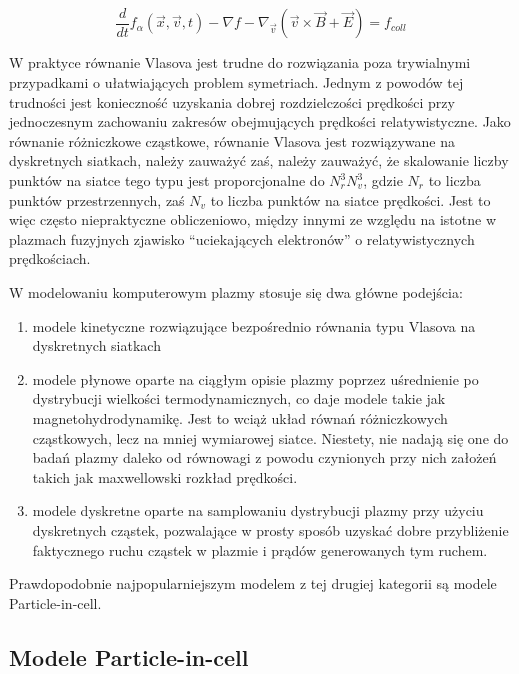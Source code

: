     \begin{equation}
        \frac{d} {dt} f_{\alpha} (\vec{x}, \vec{v}, t) - \nabla f - \nabla_{\vec{v}} (\vec{v} \times \vec{B} + \vec{E})= f_{coll}
        \label{eqn:Vlasov}
    \end{equation}

    W praktyce równanie Vlasova jest trudne do rozwiązania poza trywialnymi
    przypadkami o ułatwiających problem symetriach.  Jednym z powodów tej
    trudności jest konieczność uzyskania dobrej rozdzielczości prędkości przy
    jednoczesnym zachowaniu zakresów obejmujących prędkości relatywistyczne.
    Jako równanie różniczkowe cząstkowe, równanie Vlasova jest rozwiązywane na
    dyskretnych siatkach, należy zauważyć zaś, należy zauważyć, że skalowanie
    liczby punktów na siatce tego typu jest proporcjonalne do $N_r^3 N_v^3$,
    gdzie $N_r$ to liczba punktów przestrzennych, zaś $N_v$ to liczba punktów
    na siatce prędkości. Jest to więc często niepraktyczne obliczeniowo,
    między innymi ze względu na istotne w plazmach fuzyjnych zjawisko
    ``uciekających elektronów'' o relatywistycznych prędkościach.

    W modelowaniu komputerowym plazmy stosuje się dwa główne podejścia:
    \begin{enumerate}
        \item modele kinetyczne rozwiązujące bezpośrednio równania typu Vlasova na dyskretnych siatkach
        \item modele płynowe oparte na ciągłym opisie plazmy poprzez uśrednienie po dystrybucji
            wielkości termodynamicznych, co daje modele takie jak magnetohydrodynamikę. Jest to wciąż
            układ równań różniczkowych cząstkowych, lecz na mniej wymiarowej siatce. Niestety,
            nie nadają się one do badań plazmy daleko od równowagi z powodu czynionych przy nich
            założeń takich jak maxwellowski rozkład prędkości.
        \item modele dyskretne oparte na samplowaniu dystrybucji plazmy przy użyciu dyskretnych cząstek,
            pozwalające w prosty sposób uzyskać dobre przybliżenie faktycznego ruchu cząstek w plazmie
            i prądów generowanych tym ruchem.
    \end{enumerate}

    Prawdopodobnie najpopularniejszym modelem z tej drugiej kategorii są modele Particle-in-cell.

    \subsection{Modele Particle-in-cell}

